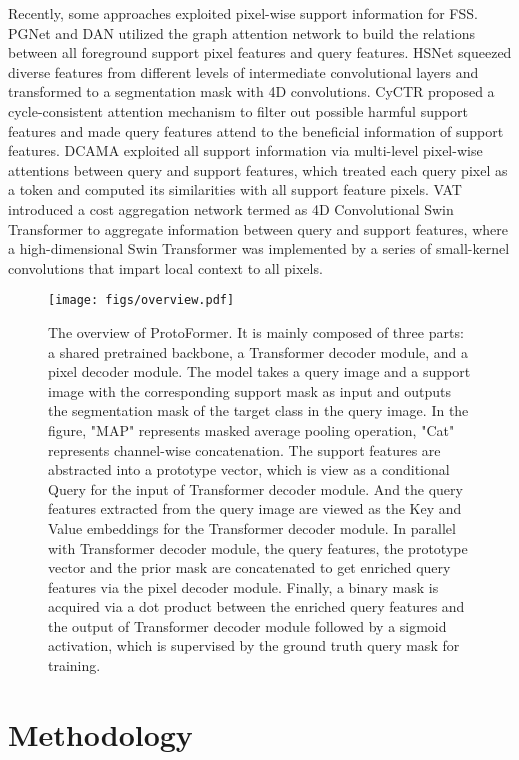 \documentclass[journal]{IEEEtran}
\begin{document}
Recently, some approaches exploited pixel-wise support information for FSS. PGNet\cite{pgnet} and DAN\cite{dan} utilized the graph attention network to build the relations between all foreground support pixel features and query features. HSNet\cite{hsnet} squeezed diverse features from different levels of intermediate convolutional layers and transformed to a segmentation mask with 4D convolutions. CyCTR\cite{cyctr} proposed a cycle-consistent attention mechanism to filter out possible harmful support features and made query features attend to the beneficial information of support features. DCAMA\cite{dcama} exploited all support information via multi-level pixel-wise attentions between query and support features, which treated each query pixel as a token and computed its similarities with all support feature pixels. VAT\cite{vat} introduced a cost aggregation network termed as 4D Convolutional Swin Transformer\cite{Liu_2021_ICCV} to aggregate information between query and support features, where a high-dimensional Swin Transformer was implemented by a series of small-kernel convolutions that impart local context to all pixels.

\begin{figure*}[t]
  \centering
  \texttt{[image: figs/overview.pdf]}
  \caption{The overview of ProtoFormer. It is mainly composed of three parts: a shared pretrained backbone, a Transformer decoder module, and a pixel decoder module. The model takes a query image and a support image with the corresponding support mask as input and outputs the segmentation mask of the target class in the query image. In the figure, "MAP" represents masked average pooling operation, "Cat" represents channel-wise concatenation. The support features are abstracted into a prototype vector, which is view as a conditional Query for the input of Transformer decoder module. And the query features extracted from the query image are viewed as the Key and Value embeddings for the Transformer decoder module. In parallel with Transformer decoder module, the query features, the prototype vector and the prior mask are concatenated to get enriched query features via the pixel decoder module. Finally, a binary mask is acquired via a dot product between the enriched query features and the output of Transformer decoder module followed by a sigmoid activation, which is supervised by the ground truth query mask for training.}
  \label{fig:overview}
\end{figure*}

\section{Methodology}
\end{document}

